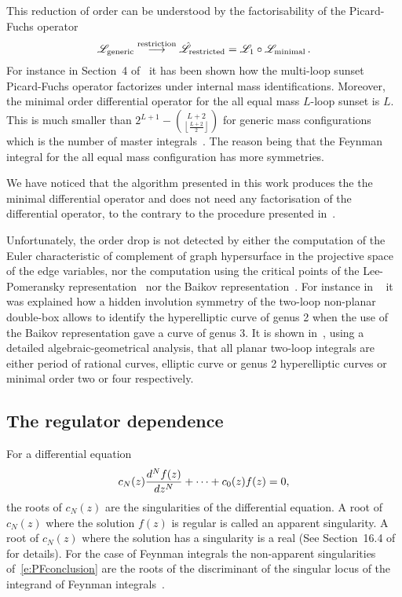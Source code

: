 \documentclass[a4paper,12pt]{article}
\numberwithin{equation}{section}
\numberwithin{figure}{section}
\begin{document}
This reduction of order can be
understood by the factorisability of the Picard-Fuchs operator
\begin{equation}
  \mathscr{L}_{\rm generic} \stackrel{\rm restriction}{\longrightarrow}
  \hat{\mathscr{L}}_{\rm restricted}   = \mathscr{L}_1 \circ\mathscr{L}_{\rm minimal} \,.
\end{equation}
For instance in Section~4 of~\cite{Lairez:2022zkj} it has been shown
how the multi-loop sunset Picard-Fuchs operator factorizes under
internal mass identifications. Moreover,
%
the minimal order differential operator for the all equal
mass $L$-loop sunset is $L$. This is much smaller than 
$2^{L+1}-\binom{L+2}{\left\lfloor \frac{L+2}{2}\right\rfloor }$ for generic
mass configurations~\cite{Lairez:2022zkj} which is the number of
master integrals~\cite{Bitoun:2017nre}.
The reason being that the Feynman integral for the all equal mass
configuration has more symmetries.  

We have noticed that the algorithm presented in this work produces the 
the minimal  differential operator and does not need any factorisation
of the differential operator, to the contrary to the procedure
presented in~\cite{Pogel:2022vat}. 
%
%

Unfortunately, the order drop is not detected by  either the
computation of the Euler characteristic of complement of graph
hypersurface in the projective space of the edge variables, nor the
computation using the critical points of the
Lee-Pomeransky representation~\cite{Lee:2013hzt}   nor the
Baikov
representation~\cite{Frellesvig:2017aai,Frellesvig:2019uqt,Cacciatori:2021nli}.
For instance in ~\cite{Marzucca:2023gto} it was explained how a hidden involution symmetry of the
two-loop non-planar double-box allows to identify the hyperelliptic
curve of genus 2 when the use of the Baikov representation gave a
curve of genus 3.
It is shown in~\cite{Doran:2023yzu}, using
a detailed  algebraic-geometrical analysis, that all planar two-loop
integrals are either period of rational curves, elliptic curve or genus
2 hyperelliptic curves or minimal order two or four respectively.

\subsection{The regulator dependence}
\label{sec:epsilon-dependence}

%
For a differential equation
\begin{equation}\label{e:PFconclusion}
c_N(z)  {d^Nf(z)\over dz^N}+\cdots + c_0(z) f(z)=0,
\end{equation}
the roots of $c_N(z)$ are the singularities of the differential
equation. A root of $c_N(z)$ where the solution $f(z)$ is
regular is called an apparent singularity. A root of $c_N(z)$
where the solution has a singularity is a real (See 
Section~16.4 of~\cite{Ince} for details). 
%
For the case of Feynman integrals the non-apparent singularities
of~\eqref{e:PFconclusion} are the roots of the
discriminant of the singular locus of the integrand of  Feynman
integrals~\cite{Doran:2023yzu}.
\end{document}
